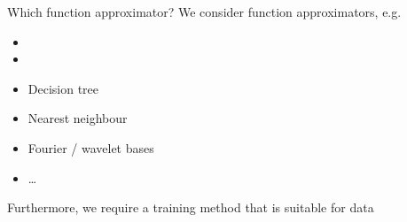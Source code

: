 \bgroup
\begin{frame}{Which function approximator?}
We consider  function approximators, e.g.\begin{itemize}
\item {}
\item {}
\item Decision tree
\item Nearest neighbour
\item Fourier / wavelet bases
\item \ldots
\end{itemize}
Furthermore, we require a training method that is suitable for  data
\end{frame}
\egroup